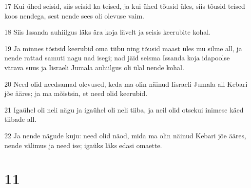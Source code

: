\par 17 Kui ühed seisid, siis seisid ka teised, ja kui ühed tõusid üles, siis tõusid teised koos nendega, sest nende sees oli olevuse vaim.
\par 18 Siis Issanda auhiilgus läks ära koja lävelt ja seisis keerubite kohal.
\par 19 Ja minnes tõstsid keerubid oma tiibu ning tõusid maast üles mu silme all, ja nende rattad samuti nagu nad isegi; nad jäid seisma Issanda koja idapoolse värava suus ja Iisraeli Jumala auhiilgus oli ülal nende kohal.
\par 20 Need olid needsamad olevused, keda ma olin näinud Iisraeli Jumala all Kebari jõe ääres; ja ma mõistsin, et need olid keerubid.
\par 21 Igaühel oli neli nägu ja igaühel oli neli tiiba, ja neil olid otsekui inimese käed tiibade all.
\par 22 Ja nende nägude kuju: need olid näod, mida ma olin näinud Kebari jõe ääres, nende välimus ja need ise; igaüks läks edasi omaette.

\chapter{11}

